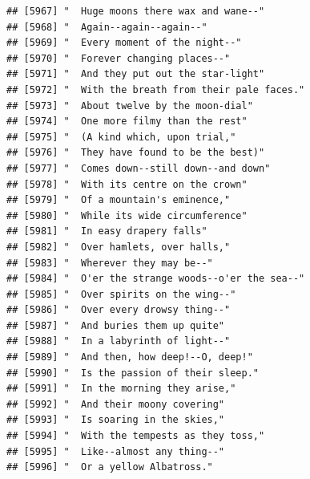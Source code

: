 \documentclass{article}\usepackage[]{graphicx}\usepackage[]{color}
\makeatletter
\newenvironment{kframe}{%
 \def\at@end@of@kframe{}%
 \ifinner\ifhmode%
  \def\at@end@of@kframe{\end{minipage}}%
  \begin{minipage}{\columnwidth}%
 \fi\fi%
 \def\FrameCommand##1{\hskip\@totalleftmargin \hskip-\fboxsep
 \colorbox{shadecolor}{##1}\hskip-\fboxsep
     \hskip-\linewidth \hskip-\@totalleftmargin \hskip\columnwidth}%
 \MakeFramed {\advance\hsize-\width
   \@totalleftmargin\z@ \linewidth\hsize
   \@setminipage}}%
 {\par\unskip\endMakeFramed%
 \at@end@of@kframe}
\newenvironment{knitrout}{}{} %
\makeatother
\begin{document}
\begin{knitrout}
\begin{kframe}
\begin{verbatim}
## [5967] "  Huge moons there wax and wane--"                                           
## [5968] "  Again--again--again--"                                                     
## [5969] "  Every moment of the night--"                                               
## [5970] "  Forever changing places--"                                                 
## [5971] "  And they put out the star-light"                                           
## [5972] "  With the breath from their pale faces."                                    
## [5973] "  About twelve by the moon-dial"                                             
## [5974] "  One more filmy than the rest"                                              
## [5975] "  (A kind which, upon trial,"                                                
## [5976] "  They have found to be the best)"                                           
## [5977] "  Comes down--still down--and down"                                          
## [5978] "  With its centre on the crown"                                              
## [5979] "  Of a mountain's eminence,"                                                 
## [5980] "  While its wide circumference"                                              
## [5981] "  In easy drapery falls"                                                     
## [5982] "  Over hamlets, over halls,"                                                 
## [5983] "  Wherever they may be--"                                                    
## [5984] "  O'er the strange woods--o'er the sea--"                                    
## [5985] "  Over spirits on the wing--"                                                
## [5986] "  Over every drowsy thing--"                                                 
## [5987] "  And buries them up quite"                                                  
## [5988] "  In a labyrinth of light--"                                                 
## [5989] "  And then, how deep!--O, deep!"                                             
## [5990] "  Is the passion of their sleep."                                            
## [5991] "  In the morning they arise,"                                                
## [5992] "  And their moony covering"                                                  
## [5993] "  Is soaring in the skies,"                                                  
## [5994] "  With the tempests as they toss,"                                           
## [5995] "  Like--almost any thing--"                                                  
## [5996] "  Or a yellow Albatross."                                                    

\end{verbatim}
\end{kframe}
\end{knitrout}
\end{document}
